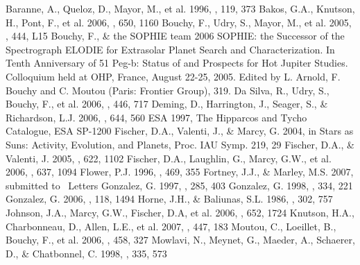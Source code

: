 \documentclass{aa}
\begin{document}
\begin{thebibliography}{}
{\small
{}
   Baranne, A., Queloz, D., Mayor, M., et al. 1996, \aaps, 119, 373
   Bakos, G.A., Knutson, H., Pont, F., et al. 2006, \apj, 650, 1160
   Bouchy, F., Udry, S., Mayor, M., et al. 2005, \aap, 444, L15
   Bouchy, F., \& the SOPHIE team 2006 SOPHIE: the Successor of the
   Spectrograph ELODIE for Extrasolar Planet Search and Characterization. In
   Tenth Anniversary of 51 Peg-b: Status of and Prospects for Hot Jupiter
   Studies. Colloquium held at OHP, France, August 22-25, 2005. Edited by
   L. Arnold, F. Bouchy and C. Moutou (Paris: Frontier Group), 319.
   Da Silva, R., Udry, S., Bouchy, F., et al. 2006, \aap, 446, 717
   Deming, D., Harrington, J., Seager, S., \& Richardson, L.J. 2006, \apj,
   644, 560
   ESA 1997, The Hipparcos and Tycho Catalogue, ESA SP-1200
   Fischer, D.A., Valenti, J., \& Marcy, G. 2004, in Stars as Suns:
   Activity, Evolution, and Planets, Proc. IAU Symp. 219, 29
   Fischer, D.A., \& Valenti, J. 2005, \apj, 622, 1102
   Fischer, D.A., Laughlin, G., Marcy, G.W., et al. 2006, \apj, 637, 1094
   Flower, P.J. 1996, \apj, 469, 355
   Fortney, J.J., \& Marley, M.S. 2007, submitted to \apj~Letters
   Gonzalez, G. 1997, \mnras, 285, 403
   Gonzalez, G. 1998, \aap, 334, 221
   Gonzalez, G. 2006, \pasp, 118, 1494
   Horne, J.H., \& Baliunas, S.L. 1986, \apj, 302, 757
   Johnson, J.A., Marcy, G.W., Fischer, D.A, et al. 2006, \apj, 652, 1724
   Knutson, H.A., Charbonneau, D., Allen, L.E., et al. 2007, \nat, 447, 183
   Moutou, C., Loeillet, B., Bouchy, F., et al. 2006, \aap, 458, 327
   Mowlavi, N., Meynet, G., Maeder, A., Schaerer, D., \& Chatbonnel, C.
   1998, \aap, 335, 573
}
\end{thebibliography}
\end{document}
